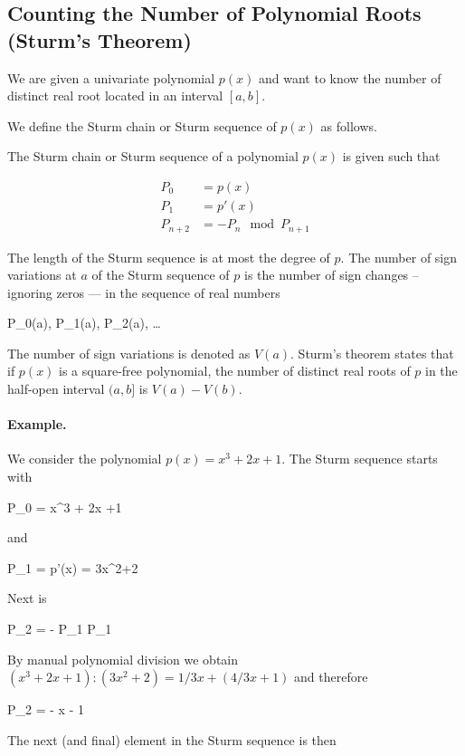 \subsection{Counting the Number of Polynomial Roots (Sturm's Theorem)}

We are given a univariate polynomial $p(x)$ and want to know the number of distinct real root located in an interval $[a,b]$.

We define the Sturm chain or Sturm sequence of $p(x)$ as follows.

\begin{definition}
The Sturm chain or Sturm sequence of a polynomial $p(x)$ is given such that

\begin{align}
P_0 &= p(x) \\
P_1 &= p'(x) \\
P_{n+2} &= - P_n \mod P_{n+1}
\end{align}

\end{definition}

The length of the Sturm sequence is at most the degree of $p$. The number of sign variations at $a$ of the Sturm sequence of $p$ is the number of sign changes – ignoring zeros — in the sequence of real numbers

\bee
P_0(a), P_1(a), P_2(a), \ldots 
\eee

The  number of sign variations is denoted as $V(a)$. Sturm's theorem states that if $p(x)$ is a square-free polynomial, the number of distinct real roots of $p$ in the half-open interval $(a, b]$ is $V(a) - V(b)$.

\paragraph{Example.} We consider the polynomial $p(x) = x^3 + 2x +1$. The Sturm sequence starts with 

\bee
P_0 = x^3 + 2x +1
\eee

and

\bee
P_1 = p'(x) = 3x^2+2
\eee

Next is

\bee
P_2 = - P_1 \mod P_1
\eee

By manual polynomial division we obtain $(x^3 + 2x + 1):(3x^2+2) = 1/3 x + \left(4/3x + 1 \right)$ and therefore

\bee
P_2 = - x - 1
\eee

The next (and final) element in the Sturm sequence is then

